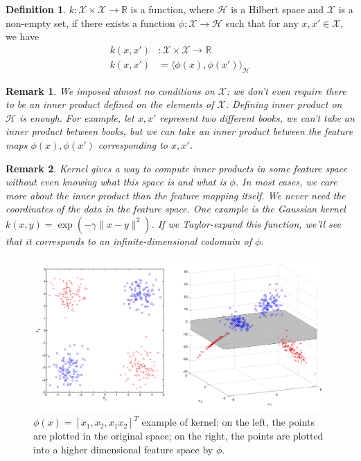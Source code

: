 \documentclass[a4paper]{article}
\theoremstyle{definition}
\newtheorem{definition}{Definition}
\theoremstyle{plain}
\newtheorem{remark}{Remark}
\newcounter{example}{Example}
\begin{document}
\begin{definition}\cite{ucl}
 $k:\mathcal{X}\times\mathcal{X}\rightarrow\mathbb{R}$ is a function, where $\mathcal{H}$ is a Hilbert space and $\mathcal{X}$ is a non-empty set, if there exists a function $\phi:\mathcal{X}\rightarrow\mathcal{H}$ such that for any $x,x'\in\mathcal{X}$, we have
\begin{align*}
    k(x,x')&:\mathcal{X}\times\mathcal{X}\rightarrow\mathbb{R}\\
    k(x,x')&=\langle \phi(x),\phi(x')\rangle_\mathcal{H}
\end{align*} 
\end{definition}

\begin{remark}
We imposed almost no conditions on $\mathcal{X}$: we don't even require there to be an inner product defined on the elements of $\mathcal{X}$. Defining inner product on $\mathcal{H}$ is enough. For example, let $x,x'$ represent two different books, we can't take an inner product between books, but we can take an inner product between the feature maps $\phi(x),\phi(x')$ corresponding to $x,x'$.
\end{remark}

\begin{remark}
Kernel gives a way to compute inner products in some feature space without even knowing what this space is and what is $\phi$. In most cases, we care more about the inner product than the feature mapping itself. We never need the coordinates of the data in the
feature space. One example is the Gaussian kernel $k(x,y)=\exp(−\gamma\|x−y\|^2)$. If we Taylor-expand this function, we'll see that it corresponds to an infinite-dimensional codomain of $\phi$.
\end{remark}

\begin{figure}[H]
\centering
\includegraphics[scale=0.3]{figure/kernel.png}
\caption{$\phi(x)=[x_1,x_2,x_1x_2]^T$ example of kernel: on the left, the points are plotted in the original space; on the right, the points are plotted into a higher dimensional feature space by $\phi$.}
\end{figure}
\end{document}
